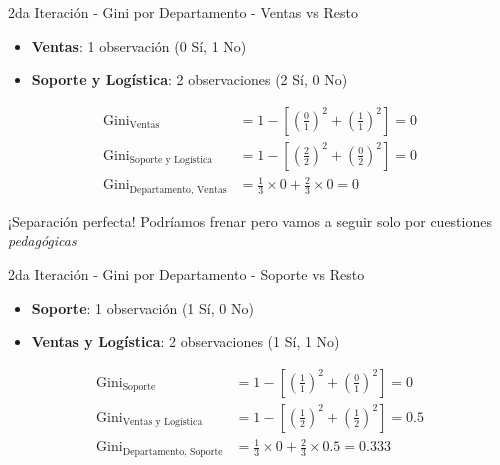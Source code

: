 \documentclass{beamer}
\begin{document}
\begin{frame}{2da Iteración - Gini por Departamento - Ventas vs Resto}
    \begin{itemize}
        \item \textbf{Ventas}: 1 observación (0 Sí, 1 No)
        \item \textbf{Soporte y Logística}: 2 observaciones (2 Sí, 0 No)
    \end{itemize}
    
    \vspace{0.5em}
    
    \begin{align*}
        \mathrm{Gini}_{\text{Ventas}} &= 1 - \left[\left(\tfrac{0}{1}\right)^2 + \left(\tfrac{1}{1}\right)^2\right] = 0 \\
        \mathrm{Gini}_{\text{Soporte y Logística}} &= 1 - \left[\left(\tfrac{2}{2}\right)^2 + \left(\tfrac{0}{2}\right)^2\right] = 0 \\
        \mathrm{Gini}_{\text{Departamento, Ventas}} &= \tfrac{1}{3}\times0 + \tfrac{2}{3}\times0 = 0
    \end{align*}

    ¡Separación perfecta! Podríamos frenar pero vamos a seguir solo por cuestiones \textit{pedagógicas}
\end{frame}

\begin{frame}{2da Iteración - Gini por Departamento - Soporte vs Resto}
    \begin{itemize}
        \item \textbf{Soporte}: 1 observación (1 Sí, 0 No)
        \item \textbf{Ventas y Logística}: 2 observaciones (1 Sí, 1 No)
    \end{itemize}
    
    \vspace{0.5em}
    
    \begin{align*}
        \mathrm{Gini}_{\text{Soporte}} &= 1 - \left[\left(\tfrac{1}{1}\right)^2 + \left(\tfrac{0}{1}\right)^2\right] = 0 \\
        \mathrm{Gini}_{\text{Ventas y Logística}} &= 1 - \left[\left(\tfrac{1}{2}\right)^2 + \left(\tfrac{1}{2}\right)^2\right] = 0.5 \\
        \mathrm{Gini}_{\text{Departamento, Soporte}} &= \tfrac{1}{3}\times0 + \tfrac{2}{3}\times0.5 = 0.333
    \end{align*}
\end{frame}
\end{document}

